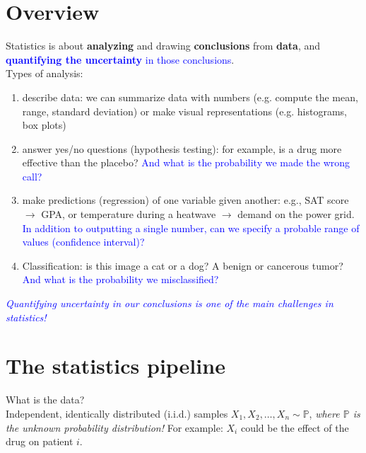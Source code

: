 \documentclass[11pt]{article}
\begin{document}



\section{Overview}

Statistics is about \textbf{analyzing} and drawing \textbf{conclusions} from \textbf{data}, and \textcolor{blue}{\textbf{quantifying the uncertainty} in those conclusions}.  \\

\noindent Types of analysis:
\begin{enumerate}
\item describe data: we can summarize data with numbers (e.g. compute the mean, range, standard deviation) or make visual representations (e.g. histograms, box plots)
\item answer yes/no questions (hypothesis testing): for example, is a drug more effective than the placebo?
\textcolor{blue}{And what is the probability we made the wrong call?}
\item make predictions (regression) of one variable given another: e.g., SAT score $\rightarrow$ GPA, or temperature during a heatwave $\rightarrow$ demand on the power grid. \textcolor{blue}{In addition to outputting a single number, can we specify a probable range of values (confidence interval)?}
\item Classification: is this image a cat or a dog? A benign or cancerous tumor? \textcolor{blue}{And what is the probability we misclassified?}
\end{enumerate}

\noindent\emph{\textcolor{blue}{Quantifying uncertainty in our conclusions is one of the main challenges in statistics!}}

\section{The statistics pipeline}
\noindent What is the data? \\
Independent, identically distributed (i.i.d.) samples $X_1,X_2,\dots, X_n\sim \mathbb P$, \emph{where $\mathbb P$ is the unknown probability distribution!} For example: $X_i$ could be the effect of the drug on patient $i$.\\
\end{document}
